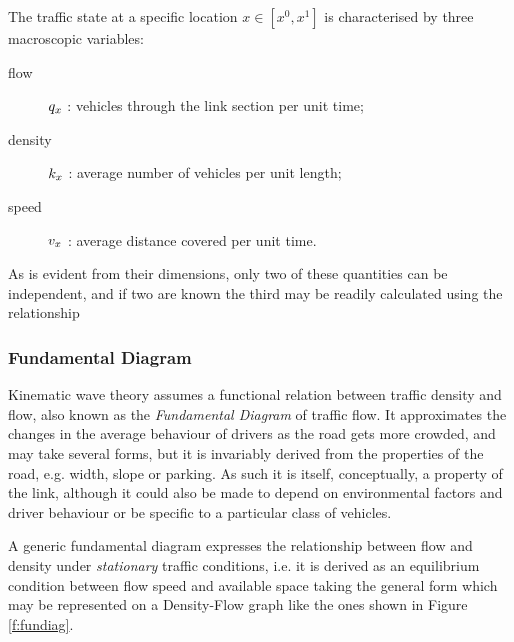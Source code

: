 The traffic state at a specific location $x \in \left[x^0, x^1\right]$ is characterised by three macroscopic variables:
\begin{description}
\item[flow] $q_x$ : vehicles through the link section per unit time;
\item[density] $k_x$ : average number of vehicles per unit length;
\item[speed] $v_x$ : average distance covered per unit time.
\end{description}
As is evident from their dimensions, only two of these quantities can be independent, and if two are known the third may be readily calculated using the relationship


\subsubsection{Fundamental Diagram} \label{s:fundiag}
Kinematic wave theory assumes a functional relation between traffic density and flow, also known as the \emph{Fundamental Diagram} of traffic flow. It approximates the changes in the average behaviour of drivers as the road gets more crowded, and may take several forms, but it is invariably derived from the properties of the road, e.g. width, slope or parking. As such it is itself, conceptually, a property of the link, although it could also be made to depend on environmental factors and driver behaviour or be specific to a particular class of vehicles.

A generic fundamental diagram expresses the relationship between flow and density under \emph{stationary} traffic conditions, i.e. it is derived as an equilibrium condition between flow speed and available space taking the general form
which may be represented on a Density-Flow graph like the ones shown in Figure \ref{f:fundiag}.

